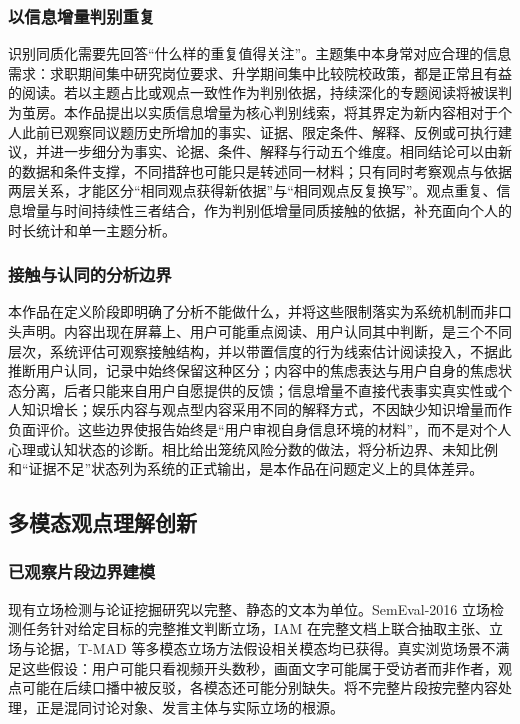 \subsubsection{以信息增量判别重复}\label{section:4.1.2}

识别同质化需要先回答``什么样的重复值得关注''。主题集中本身常对应合理的信息需求：求职期间集中研究岗位要求、升学期间集中比较院校政策，都是正常且有益的阅读。若以主题占比或观点一致性作为判别依据，持续深化的专题阅读将被误判为茧房。本作品提出以实质信息增量为核心判别线索，将其界定为新内容相对于个人此前已观察同议题历史所增加的事实、证据、限定条件、解释、反例或可执行建议，并进一步细分为事实、论据、条件、解释与行动五个维度。相同结论可以由新的数据和条件支撑，不同措辞也可能只是转述同一材料；只有同时考察观点与依据两层关系，才能区分``相同观点获得新依据''与``相同观点反复换写''。观点重复、信息增量与时间持续性三者结合，作为判别低增量同质接触的依据，补充面向个人的时长统计和单一主题分析。

\subsubsection{接触与认同的分析边界}\label{section:4.1.3}

本作品在定义阶段即明确了分析不能做什么，并将这些限制落实为系统机制而非口头声明。内容出现在屏幕上、用户可能重点阅读、用户认同其中判断，是三个不同层次，系统评估可观察接触结构，并以带置信度的行为线索估计阅读投入，不据此推断用户认同，记录中始终保留这种区分；内容中的焦虑表达与用户自身的焦虑状态分离，后者只能来自用户自愿提供的反馈；信息增量不直接代表事实真实性或个人知识增长；娱乐内容与观点型内容采用不同的解释方式，不因缺少知识增量而作负面评价。这些边界使报告始终是``用户审视自身信息环境的材料''，而不是对个人心理或认知状态的诊断。相比给出笼统风险分数的做法，将分析边界、未知比例和``证据不足''状态列为系统的正式输出，是本作品在问题定义上的具体差异。

\subsection{多模态观点理解创新}\label{section:4.2}

\subsubsection{已观察片段边界建模}\label{section:4.2.1}

现有立场检测与论证挖掘研究以完整、静态的文本为单位。SemEval-2016 立场检测任务针对给定目标的完整推文判断立场\cite{ref8}，IAM 在完整文档上联合抽取主张、立场与论据\cite{ref13}，T-MAD 等多模态立场方法假设相关模态均已获得\cite{ref14}。真实浏览场景不满足这些假设：用户可能只看视频开头数秒，画面文字可能属于受访者而非作者，观点可能在后续口播中被反驳，各模态还可能分别缺失。将不完整片段按完整内容处理，正是混同讨论对象、发言主体与实际立场的根源。

